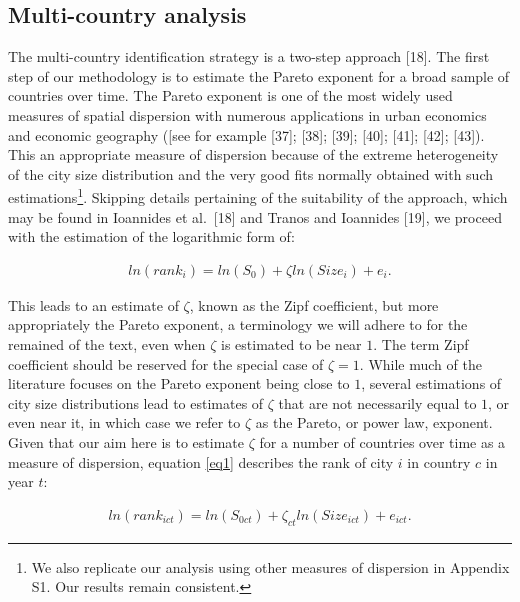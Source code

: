 \documentclass[10pt,letterpaper]{article}
\begin{document}
\hypertarget{sec3.1}{%
\subsection{Multi-country analysis}\label{sec3.1}}

The multi-country identification strategy is a two-step approach
{[}18{]}. The first step of our methodology is to estimate the
\color{blue} Pareto exponent \color{black} for a broad sample of
countries over time. \color{blue} The Pareto exponent \color{black} is
one of the most widely used measures of spatial dispersion with numerous
applications in urban economics and economic geography ({[}see for
example {[}37{]}; {[}38{]}; {[}39{]}; {[}40{]}; {[}41{]}; {[}42{]};
{[}43{]}). This an appropriate measure of dispersion because of the
extreme heterogeneity of the city size distribution and the very good
fits normally obtained with such estimations\footnote{\color{blue} We
  also replicate our analysis using other measures of dispersion in
  Appendix S1. Our results remain consistent.}. \color{black} Skipping
details pertaining of the suitability of the approach, which may be
found in Ioannides et al.~{[}18{]} and Tranos and Ioannides {[}19{]}, we
proceed with the estimation of the logarithmic form of:

\begin{align}
ln(rank_{i}) = ln(S_0) + \zeta ln(Size_i) + e_{i}. \label{eq1}
\end{align}

\color{blue}

This leads to an estimate of \(\zeta\), known as the Zipf coefficient,
but more appropriately the Pareto exponent, a terminology we will adhere
to for the remained of the text, even when \(\zeta\) is estimated to be
near \(1\). The term Zipf coefficient should be reserved for the special
case of \(\zeta=1\). While much of the literature focuses on the Pareto
exponent being close to \(1\), several estimations of city size
distributions lead to estimates of \(\zeta\) that are not necessarily
equal to \(1\), or even near it, in which case we refer to \(\zeta\) as
the Pareto, or power law, exponent. Given that our aim here is to
estimate \(\zeta\) for a number of countries over time as a measure of
dispersion, equation \ref{eq1} describes the rank of city \(i\) in
country \(c\) in year \(t\): \color{black}

\begin{align}
ln(rank_{ict}) = ln(S_{0ct}) + \zeta_{ct} ln(Size_{ict}) + e_{ict}. \label{eq2}
\end{align}
\end{document}
